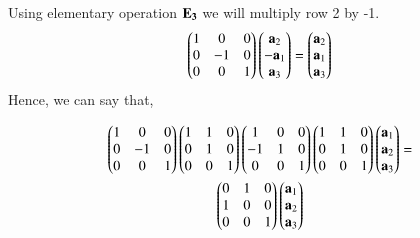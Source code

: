   Using elementary operation $\bf{E}_3$ we will multiply row 2 by -1.
   \begin{align}
   \begin{pmatrix}1&0&0\\0&-1&0\\0&0&1\end{pmatrix}\begin{pmatrix}\mathbf{a}_2\\-\mathbf{a}_1\\\mathbf{a}_3\end{pmatrix}=
  \begin{pmatrix}\mathbf{a}_2\\\mathbf{a}_1\\\mathbf{a}_3\end{pmatrix}
  \end{align}
  Hence, we can say that,

  \begin{multline}
     \begin{pmatrix}1&0&0\\0&-1&0\\0&0&1\end{pmatrix} \begin{pmatrix}1&1&0\\0&1&0\\0&0&1\end{pmatrix}\begin{pmatrix}1&0&0\\-1&1&0\\0&0&1\end{pmatrix}\begin{pmatrix}1&1&0\\0&1&0\\0&0&1\end{pmatrix}\begin{pmatrix}\mathbf{a}_{1}\\\mathbf{a}_{2}\\\mathbf{a}_{3}\end{pmatrix}=\\ \begin{pmatrix}0&1&0\\1&0&0\\0&0&1\end{pmatrix}\begin{pmatrix}\mathbf{a}_{1}\\\mathbf{a}_{2}\\\mathbf{a}_{3}\end{pmatrix}
     \end{multline}

